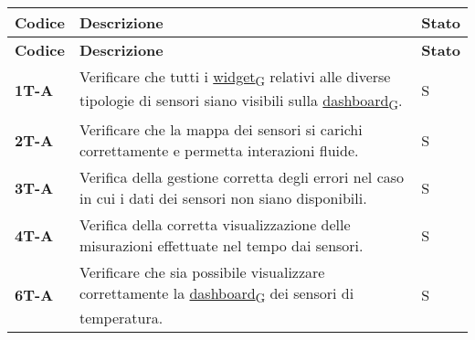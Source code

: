 \begin{longtable}{|>{\raggedright\arraybackslash}m{}|>{\raggedright\arraybackslash}m{}|>{\raggedright\arraybackslash}m{}|}
	\hline
	\textbf{Codice} & \textbf{Descrizione}                                                                                                                                                                                                                                                                                            & \textbf{Stato} \\
	\hline
	\endfirsthead
	\hline
	\textbf{Codice} & \textbf{Descrizione}                                                                                                                                                                                                                                                                                            & \textbf{Stato} \\
	\endhead
	\textbf{1T-A}   & Verificare che tutti i \href{https://7last.github.io/docs/pb/documentazione-interna/glossario\#widget}{widget\textsubscript{G}} relativi alle diverse tipologie di sensori siano visibili sulla \href{https://7last.github.io/docs/pb/documentazione-interna/glossario\#dashboard}{dashboard\textsubscript{G}}. & S              \\
	\hline
	\textbf{2T-A}   & Verificare che la mappa dei sensori si carichi correttamente e permetta interazioni fluide.                                                                                                                                                                                                                     & S              \\
	\hline
	\textbf{3T-A}   & Verifica della gestione corretta degli errori nel caso in cui i dati dei sensori non siano disponibili.                                                                                                                                                                                                         & S              \\
	\hline
	\textbf{4T-A}   & Verifica della corretta visualizzazione delle misurazioni effettuate nel tempo dai sensori.                                                                                                                                                                                                                     & S              \\
	\hline
	\textbf{6T-A}   & Verificare che sia possibile visualizzare correttamente la \href{https://7last.github.io/docs/pb/documentazione-interna/glossario\#dashboard}{dashboard\textsubscript{G}} dei sensori di temperatura.                                                                                                           & S              \\

\end{longtable}
